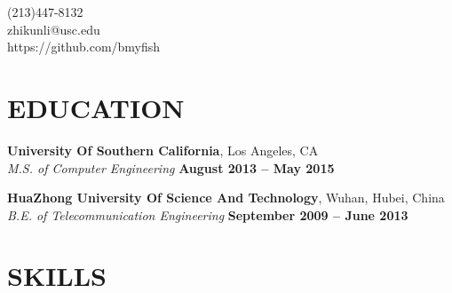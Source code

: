 \documentclass[margin,line]{resume}
\begin{document}
{
	\sc
    \hfill (213)447-8132                  		  \vspace{0mm}\\\vspace{0mm}%
    \hfill zhikunli@usc.edu            		      \vspace{0mm}\\\vspace{0mm}%
    \hfill https://github.com/bmyfish             \vspace{0mm}\\\vspace{-10mm}%
}
\vspace{1mm}

\begin{resume}

\vspace{1mm}

    \section{\mysidestyle \textbf{\large{E}\small{DUCATION}}}
    \textbf{\listing University Of Southern California}, Los Angeles, CA \vspace{2mm}\\\vspace{1mm}%
    \textsl{M.S. of Computer Engineering} \hfill \textbf{August 2013 -- May 2015}\vspace{-3mm}\\\vspace{-1mm}%

    \textbf{\listing HuaZhong University Of Science And Technology}, Wuhan, Hubei, China \vspace{2mm}\\\vspace{1mm}%
    \textsl{B.E. of Telecommunication Engineering} \hfill \textbf{September 2009 -- June 2013}\vspace{-3mm}\\\vspace{-1mm}%

\sectionline

    \section{\mysidestyle \textbf{\large{S}\small{KILLS}}}


\end{resume}
\end{document}
